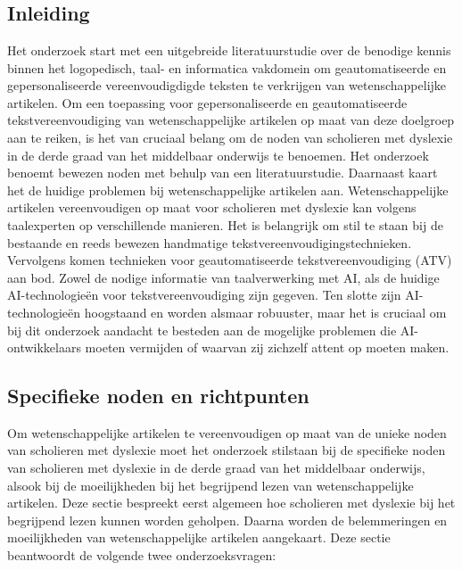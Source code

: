 \chapter{}%
\label{ch:stand-van-zaken}

\section{Inleiding}

Het onderzoek start met een uitgebreide literatuurstudie over de benodige kennis binnen het logopedisch, taal- en informatica vakdomein om geautomatiseerde en gepersonaliseerde vereenvoudigdigde teksten te verkrijgen van wetenschappelijke artikelen. Om een toepassing voor gepersonaliseerde en geautomatiseerde tekstvereenvoudiging van wetenschappelijke artikelen  op maat van deze doelgroep aan te reiken, is het van cruciaal belang om de noden van scholieren met dyslexie in de derde graad van het middelbaar onderwijs te benoemen. Het onderzoek benoemt bewezen noden met behulp van een literatuurstudie. Daarnaast kaart het de huidige problemen bij wetenschappelijke artikelen aan. Wetenschappelijke artikelen vereenvoudigen op maat voor scholieren met dyslexie kan volgens taalexperten op verschillende manieren. Het is belangrijk om stil te staan bij de bestaande en reeds bewezen handmatige tekstvereenvoudigingstechnieken. Vervolgens komen technieken voor geautomatiseerde tekstvereenvoudiging (ATV) aan bod. Zowel de nodige informatie van taalverwerking met AI, als de huidige AI-technologieën voor tekstvereenvoudiging zijn gegeven. Ten slotte zijn AI- technologieën hoogstaand en worden alsmaar robuuster, maar het is cruciaal om bij dit onderzoek aandacht te besteden aan de mogelijke problemen die AI- ontwikkelaars moeten vermijden of waarvan zij zichzelf attent op moeten maken. 

\section{Specifieke noden en richtpunten}

Om wetenschappelijke artikelen te vereenvoudigen op maat van de unieke noden van scholieren met dyslexie moet het onderzoek stilstaan bij de specifieke noden van scholieren met dyslexie in de derde graad van het middelbaar onderwijs, alsook bij de moeilijkheden bij het begrijpend lezen van wetenschappelijke artikelen. Deze sectie bespreekt eerst algemeen hoe scholieren met dyslexie bij het begrijpend lezen kunnen worden geholpen. Daarna worden de belemmeringen en moeilijkheden van wetenschappelijke artikelen aangekaart. Deze sectie beantwoordt de volgende twee onderzoeksvragen: 

